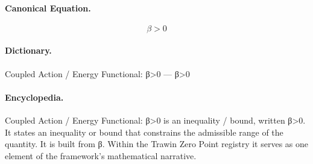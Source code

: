 \paragraph{Canonical Equation.}
\[
\beta>0
\]

\paragraph{Dictionary.}
Coupled Action / Energy Functional: β>0 — β>0

\paragraph{Encyclopedia.}
Coupled Action / Energy Functional: β>0 is an inequality / bound, written β>0. It states an inequality or bound that constrains the admissible range of the quantity. It is built from β. Within the Trawin Zero Point registry it serves as one element of the framework's mathematical narrative.
